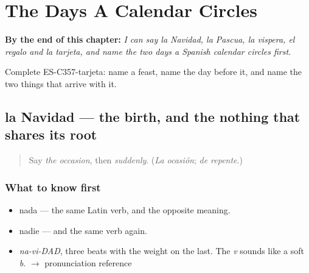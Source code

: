 
\chapter{The Days A Calendar Circles}
\label{ch:la-navidad-y-la-pascua}

\begin{chapteropening}
\textbf{By the end of this chapter:} \emph{I can say la Navidad, la Pascua, la vispera, el regalo and la tarjeta, and name the two days a Spanish calendar circles first.}

Complete ES-C357-tarjeta: name a feast, name the day before it, and name the two things that arrive with it.
\end{chapteropening}

\section[la Navidad]{la Navidad — the birth, and the nothing that shares its root}

\label{lesson:ES-C357-navidad}



\begin{quote}
Say \emph{the occasion}, then \emph{suddenly}. (\emph{La ocasión}; \emph{de repente}.)
\end{quote}

\subsection*{What to know first}
\begin{itemize}
\raggedright
  \item nada — the same Latin verb, and the opposite meaning.
  \item nadie — and the same verb again.
\end{itemize}

\begin{sounds}
\begin{itemize}
\raggedright
  \item \emph{na-vi-DAD}, three beats with the weight on the last. The \emph{v} sounds like a soft \emph{b}. $\to$ pronunciation reference
\end{itemize}
\end{sounds}

